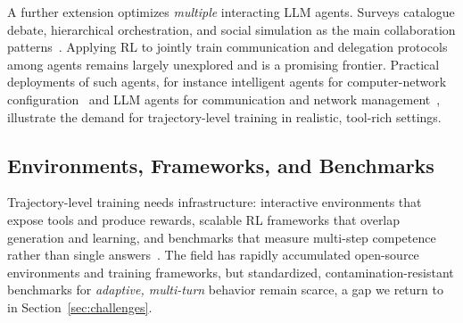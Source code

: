 A further extension optimizes \emph{multiple} interacting LLM agents.
Surveys catalogue debate, hierarchical orchestration, and social
simulation as the main collaboration
patterns~\cite{talebirad2024multiagent,han2025collaboration,du2023debate,hong2023metagpt,park2023generative}.
Applying RL to jointly train communication and delegation protocols among
agents remains largely unexplored and is a promising frontier. Practical
deployments of such agents, for instance intelligent agents for
computer-network configuration~\cite{reiznautt2026minicurso} and LLM
agents for communication and network
management~\cite{boateng2024llmnsm}, illustrate the demand for
trajectory-level training in realistic, tool-rich settings.

\subsection{Environments, Frameworks, and Benchmarks}

Trajectory-level training needs infrastructure: interactive environments
that expose tools and produce rewards, scalable RL frameworks that
overlap generation and learning, and benchmarks that measure multi-step
competence rather than single answers~\cite{zhang2026landscape}. The
field has rapidly accumulated open-source environments and training
frameworks, but standardized, contamination-resistant benchmarks for
\emph{adaptive, multi-turn} behavior remain scarce, a gap we return to
in Section~\ref{sec:challenges}.
